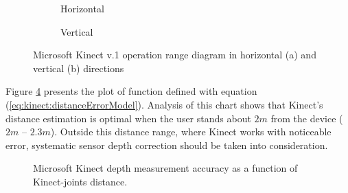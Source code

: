 \documentclass[sensors,article,submit,moreauthors,pdftex,10pt,a4paper]{mdpi}
\begin{document}
\begin{figure}[H]
	\centering
	\begin{subfigure}[b]{0.4\textwidth}
		\centering
		
		\caption{Horizontal}
		\label{fig:kinect:range:a}
	\end{subfigure} \hfill
	\begin{subfigure}[b]{0.4\textwidth}
		\centering
		
		\caption{Vertical}
		\label{fig:kinect:range:b}
	\end{subfigure} \hfill
	\begin{subfigure}[p]{\textwidth}
		\hfill
		               
	\end{subfigure}
	\caption{Microsoft Kinect v.1 operation range diagram in horizontal (a) and vertical (b) directions}
	\label{fig:kinect:range}
\end{figure}   

Figure \ref{fig:kinect:distanceAccuracy} presents the plot of function defined with equation (\ref{eq:kinect:distanceErrorModel}). Analysis of this chart shows that Kinect’s distance estimation is optimal when the user stands about $2m$ from the device ($2m$ – $2.3m$). Outside this distance range, where Kinect works with noticeable error, systematic sensor depth correction should be taken into consideration.

\begin{figure}[H]
	\centering	
											
	\caption{Microsoft Kinect depth measurement accuracy as a function of Kinect-joints distance.}
	\label{fig:kinect:distanceAccuracy}
\end{figure}
\end{document}
